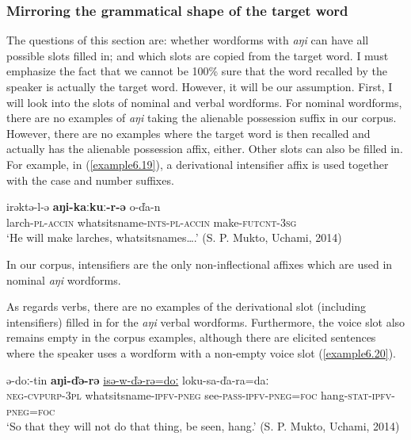 \documentclass[output=paper,colorlinks,citecolor=brown]{langscibook}
\begin{document}
\subsubsection{Mirroring the grammatical shape of the target word}

The questions of this section are: whether wordforms with \textit{aŋi} can have all possible slots filled in; and which slots are copied from the target word. I must emphasize the fact that we cannot be 100\% sure that the word recalled by the speaker is actually the target word. However, it will be our assumption. First, I will look into the slots of nominal and verbal wordforms. For nominal wordforms, there are no examples of \textit{aŋi} taking the alienable possession suffix in our corpus. However, there are no examples where the target word is then recalled and actually has the alienable possession affix, either. Other slots can also be filled in. For example, in (\ref{example6.19}), a derivational intensifier affix is used together with the case and number suffixes.

\ea
    \label{example6.19}
    \gll irəktə-l-ə	\textbf{aŋi-kaːkuː-r-ə}	o-ďa-n\\
    larch-\textsc{pl}-\textsc{accin}	whatsitsname-\textsc{ints}-\textsc{pl}-\textsc{accin}	make-\textsc{futcnt}-3\textsc{sg}\\
    \glt `He will make larches, whatsitsnames….' (S. P. Mukto, Uchami, 2014)\\
    \z

In our corpus, intensifiers are the only non-inflectional affixes which are used in nominal \textit{aŋi} wordforms.

As regards verbs, there are no examples of the derivational slot (including intensifiers) filled in for the \textit{aŋi} verbal wordforms. Furthermore, the voice slot also remains empty in the corpus examples, although there are elicited sentences where the speaker uses a wordform with a non-empty voice slot (\ref{example6.20}).

\ea
    \label{example6.20}
    \gll ə-doː-tin	\textbf{aŋi-ďə-rə}	\uline{isə-w-ďə-rə=doː} loku-sa-ďa-ra=daː\\
    \textsc{neg}-\textsc{cvpurp}-3\textsc{pl}	whatsitsname-\textsc{ipfv}-\textsc{pneg}	see-\textsc{pass}-\textsc{ipfv}-\textsc{pneg}=\textsc{foc}  hang-\textsc{stat}-\textsc{ipfv}-\textsc{pneg}=\textsc{foc}	\\
    \glt `So that they will not do that thing, be seen, hang.' (S. P. Mukto, Uchami, 2014)\\
    \z
\end{document}
